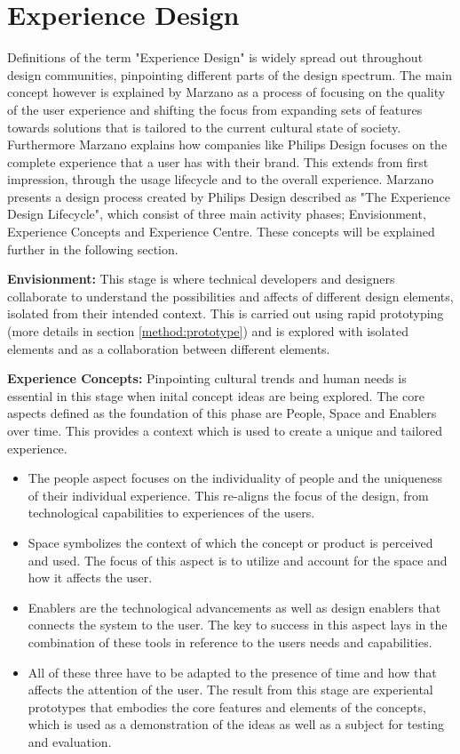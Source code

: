 \section{Experience Design}
Definitions of the term "Experience Design" is widely spread out throughout design communities, pinpointing different parts of the design spectrum. The main concept however is explained by Marzano as a process of focusing on the quality of the user experience and shifting the focus from expanding sets of features towards solutions that is tailored to the current cultural state of society\cite{experience_design:marzano2003new}. Furthermore Marzano explains how companies like Philips Design focuses on the complete experience that a user has with their brand. This extends from first impression, through the usage lifecycle and to the overall experience. Marzano presents a design process created by Philips Design described as "The Experience Design Lifecycle", which consist of three main activity phases; Envisionment, Experience Concepts and Experience Centre. These concepts will be explained further in the following section.

\textbf{Envisionment:}
This stage is where technical developers and designers collaborate to understand the possibilities and affects of different design elements, isolated from their intended context. This is carried out using rapid prototyping (more details in section \ref{method:prototype}) and is explored with isolated elements and as a collaboration between different elements.

\textbf{Experience Concepts:}
Pinpointing cultural trends and human needs is essential in this stage when inital concept ideas are being explored. The core aspects defined as the foundation of this phase are People, Space and Enablers over time. This provides a context which is used to create a  unique and tailored experience.
\begin{itemize}
  \item The people aspect focuses on the individuality of people and the uniqueness of their individual experience. This re-aligns the focus of the design, from technological capabilities to experiences of the users.
  \item Space symbolizes the context of which the concept or product is perceived and used. The focus of this aspect is to utilize and account for the space and how it affects the user.
  \item Enablers are the technological advancements as well as design enablers that connects the system to the user. The key to success in this aspect lays in the combination of these tools in reference to the users needs and capabilities.
  \item All of these three have to be adapted to the presence of time and how that affects the attention of the user. The result from this stage are experiental prototypes that embodies the core features and elements of the concepts, which is used as a demonstration of the ideas as well as a subject for testing and evaluation.
\end{itemize}

